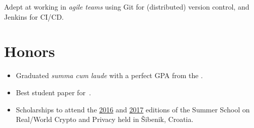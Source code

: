 \documentclass[%
version=last,%
fontsize=11pt,%
paper=A4,%
areasetadvanced,%
headinclude=false,%
footinclude=false,%
headlines=0,%
footlines=0,%
toc=bibnumbered,%
]{scrartcl}
\begin{document}
\begin{minipage}[t]{.4\textwidth}
  \begingroup%
  \small%
  Adept at working in \emph{agile teams} using Git for (distributed) version
  control, and Jenkins for CI/CD\@.\par%
  \endgroup%

  \section{Honors}%
  \label{sec:honors}

  \begin{itemize}[leftmargin=*]
  \item Graduated \emph{summa cum laude} with a perfect GPA from the
    .
  \item Best student paper
    for~\autocite{Gjorgjevski:Combining_LWE-Solving_Algorithms}.
  \item Scholarships to attend the
    \href{http://summerschool-croatia.cs.ru.nl/2016/}{2016} and
    \href{http://summerschool-croatia.cs.ru.nl/2017/}{2017} editions of the
    Summer School on Real\-/World Crypto and Privacy held in Šibenik, Croatia.
  \end{itemize}
\end{minipage}
\end{document}
